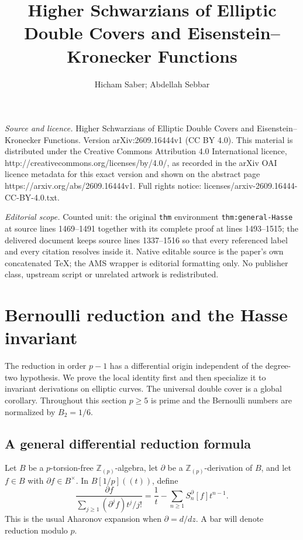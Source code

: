 \documentclass[10pt,a4paper]{amsart}
\numberwithin{equation}{section}
\begin{document}
\title[Higher Schwarzians of Elliptic Double Covers and Eisenstein-]{Higher Schwarzians of Elliptic Double Covers and Eisenstein--Kronecker Functions}
\author{Hicham Saber; Abdellah Sebbar}
\date{}
\maketitle
\noindent\emph{Source and licence.} Higher Schwarzians of Elliptic Double Covers and Eisenstein--Kronecker Functions. Version arXiv:2609.16444v1 (CC BY 4.0). This material is distributed under the Creative Commons Attribution 4.0 International licence, http://creativecommons.org/licenses/by/4.0/, as recorded in the arXiv OAI licence metadata for this exact version and shown on the abstract page https://arxiv.org/abs/2609.16444v1. Full rights notice: licenses/arxiv-2609.16444-CC-BY-4.0.txt.\par\smallskip
\noindent\textit{Editorial scope.} Counted unit: the original \texttt{thm} environment \texttt{thm:general-Hasse} at source lines 1469--1491 together with its complete proof at lines 1493--1515; the delivered document keeps source lines 1337--1516 so that every referenced label and every citation resolves inside it. Native editable source is the paper's own concatenated TeX; the AMS wrapper is editorial formatting only. No publisher class, upstream script or unrelated artwork is redistributed.
\section{Bernoulli reduction and the Hasse invariant}
\label{sec:hasse-reduction}

The reduction in order $p-1$ has a differential origin independent of
the degree-two hypothesis. We prove the local identity first and then
specialize it to invariant derivations on elliptic curves. The
universal double cover is a global corollary. Throughout this section
$p\geq5$ is prime and the Bernoulli numbers are normalized by $B_2=1/6$.

\subsection{A general differential reduction formula}

Let $B$ be a $p$-torsion-free $\mathbb Z_{(p)}$-algebra, let $\partial$
be a $\mathbb Z_{(p)}$-derivation of $B$, and let $f\in B$ with
$\partial f\in B^\times$. In $B[1/p]((t))$, define
\begin{equation}\label{eq:differential-Aharonov}
\frac{\partial f}{\displaystyle\sum_{j\geq1}
 (\partial^j f)t^j/j!}
=\frac1t-\sum_{n\geq1}S_n^\partial[f]t^{n-1}.
\end{equation}
This is the usual Aharonov expansion when $\partial=d/dz$. A bar
will denote reduction modulo $p$.
\end{document}
